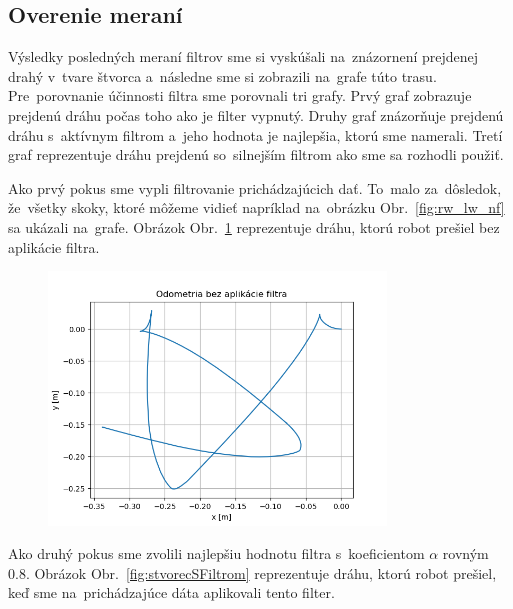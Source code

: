 \clearpage

\subsection{Overenie meraní}
\label{subsec:overenie_merani}

Výsledky posledných meraní filtrov sme si vyskúšali na~znázornení prejdenej drahý v~tvare štvorca a~následne sme si
zobrazili na~grafe túto trasu. Pre~porovnanie účinnosti filtra sme porovnali tri grafy. Prvý graf zobrazuje prejdenú
dráhu počas toho ako je filter vypnutý. Druhy graf znázorňuje prejdenú dráhu s~aktívnym filtrom a~jeho hodnota je
najlepšia, ktorú sme namerali. Tretí graf reprezentuje dráhu prejdenú so~silnejším filtrom ako sme sa rozhodli použiť.

Ako prvý pokus sme vypli filtrovanie prichádzajúcich dať. To~malo za~dôsledok, že~všetky skoky, ktoré môžeme vidieť
napríklad na~obrázku Obr.~\ref{fig:rw_lw_nf} sa ukázali na~grafe. Obrázok Obr.~\ref{fig:stvorecBezFiltra} reprezentuje
dráhu, ktorú robot prešiel bez aplikácie filtra.

\begin{figure}[!htbp]
	\begin{center}
		\includegraphics[width=0.8\textwidth]{img/stvorec_bez_filtra.png}
	\end{center}
	\caption{}
	\label{fig:stvorecBezFiltra}
\end{figure}

Ako druhý pokus sme zvolili najlepšiu hodnotu filtra s~koeficientom $\alpha$ rovným 0.8.
Obrázok Obr.~\ref{fig:stvorecSFiltrom} reprezentuje dráhu, ktorú robot prešiel, keď sme
na~prichádzajúce dáta aplikovali tento filter.

\clearpage

